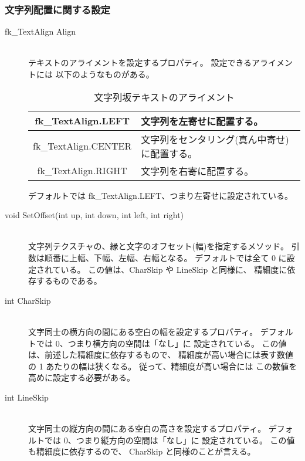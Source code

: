 \subsubsection{文字列配置に関する設定}
\begin{description}
\item[fk\_TextAlign Align] ~ \\
	テキストのアライメントを設定するプロパティ。
	設定できるアライメントには
	以下のようなものがある。
		\begin{table}[H]
		\caption{文字列坂テキストのアライメント}
		\label{tbl:textAlign}
		\begin{center}
		\begin{tabular}{|c|l|}
		\hline
		fk\_TextAlign.LEFT & 文字列を左寄せに配置する。\\ \hline
		fk\_TextAlign.CENTER &
		文字列をセンタリング(真ん中寄せ)に配置する。\\ \hline
		fk\_TextAlign.RIGHT & 文字列を右寄に配置する。\\ \hline
		\end{tabular}
		\end{center}
		\end{table}
	デフォルトでは fk\_TextAlign.LEFT、つまり左寄せに設定されている。\\

\item[void SetOffset(int up, int down, int left, int right)] ~ \\
	文字列テクスチャの、縁と文字のオフセット(幅)を指定するメソッド。
	引数は順番に上幅、下幅、左幅、右幅となる。
	デフォルトでは全て 0 に設定されている。
	この値は、CharSkip や LineSkip と同様に、
	精細度に依存するものである。\\

\item[int CharSkip] ~ \\
	文字同士の横方向の間にある空白の幅を設定するプロパティ。
	デフォルトでは 0、つまり横方向の空間は「なし」に
	設定されている。
	この値は、前述した精細度に依存するもので、
	精細度が高い場合には表す数値の 1 あたりの幅は狭くなる。
	従って、精細度が高い場合には
	この数値を高めに設定する必要がある。\\

\item[int LineSkip] ~ \\
	文字同士の縦方向の間にある空白の高さを設定するプロパティ。
	デフォルトでは 0、つまり縦方向の空間は「なし」に
	設定されている。
	この値も精細度に依存するので、
	CharSkip と同様のことが言える。\\


\end{description}
